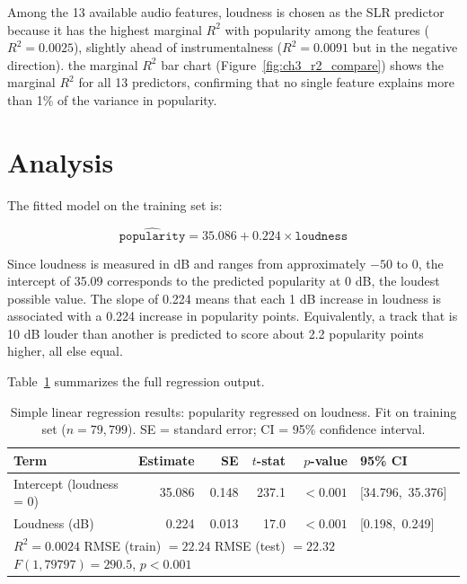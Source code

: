 \documentclass[12pt, oneside]{book}
\begin{document}
Among the 13 available audio features, loudness is chosen as the SLR predictor because it has the highest marginal $R^2$ with popularity among the features ($R^2 = 0.0025$), slightly ahead of instrumentalness ($R^2 = 0.0091$ but in the negative direction). the marginal $R^2$ bar chart (Figure~\ref{fig:ch3_r2_compare}) shows the marginal $R^2$ for all 13 predictors, confirming that no single feature explains more than 1\% of the variance in popularity.
 
 
\section{Analysis}
 
The fitted model on the training set is:
 
\begin{equation}
\widehat{\texttt{popularity}} = 35.086 + 0.224 \times \texttt{loudness}
\label{eq:slr}
\end{equation}
 
Since loudness is measured in dB and ranges from approximately $-50$ to $0$, the intercept of 35.09 corresponds to the predicted popularity at 0 dB, the loudest possible value. The slope of 0.224 means that each 1 dB increase in loudness is associated with a 0.224 increase in popularity points. Equivalently, a track that is 10 dB louder than another is predicted to score about 2.2 popularity points higher, all else equal.
 
Table~\ref{tab:ch3_results} summarizes the full regression output.
 
\begin{table}[H]
\centering
\caption{Simple linear regression results: popularity regressed on loudness. Fit on training set ($n = 79{,}799$). SE = standard error; CI = 95\% confidence interval.}
\label{tab:ch3_results}
\begin{tabular}{lrrrrl}
\toprule
\textbf{Term} & \textbf{Estimate} & \textbf{SE} & \textbf{$t$-stat} & \textbf{$p$-value} & \textbf{95\% CI} \\
\midrule
Intercept (loudness = 0) & 35.086 & 0.148 & 237.1 & $< 0.001$ & [34.796,\ 35.376] \\
Loudness (dB)            &  0.224 & 0.013 &  17.0 & $< 0.001$ & [0.198,\ 0.249] \\
\midrule
\multicolumn{6}{l}{$R^2 = 0.0024$ \quad RMSE (train) $= 22.24$ \quad RMSE (test) $= 22.32$ \quad $F(1,79797) = 290.5$, $p < 0.001$} \\
\bottomrule
\end{tabular}
\end{table}
 
\end{document}
